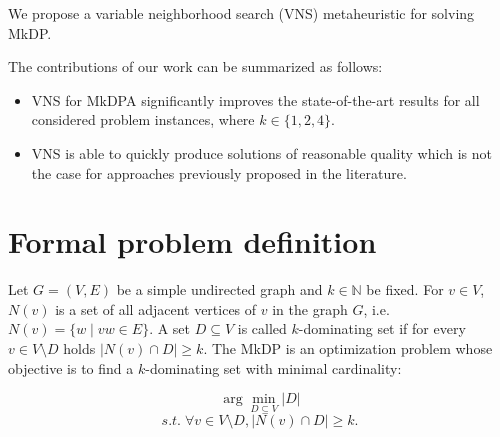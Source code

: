 \documentclass[dvipsnames,format=sigconf]{acmart} %
\begin{document}
We propose a variable neighborhood search (VNS) metaheuristic for solving MkDP. 
\begin{comment}
The main algorithm components of this algorithm are:
\begin{itemize}
	\item A carefully designed fitness function that evaluates solutions  including also unfeasible ones; it takes into consideration two scores ($i$) the size of dominating set and ($ii$) a measure of penalization that evaluates how far is the considered set from being a $k$--dominating. 
	\item A shaking procedure that systematically destructs feasible solutions and ensures escaping the algorithm from a local optima. It is based on swap operations. 
	\item An efficient swap--based  best-improvement local search mechanism   has been applied. It is equipped with an quick partial evaluation of the fitness function, executed in linear time.
\end{itemize}
\end{comment}
The contributions of our work can be summarized as follows:
\begin{itemize}	
	\item VNS for MkDPA significantly improves the state-of-the-art results for all considered problem instances, where $k \in \{1, 2, 4\}$.
	
	\item VNS is able to quickly produce solutions of reasonable quality which is not the case for approaches previously proposed in the literature.
\end{itemize}

\section{Formal problem definition }
    
Let $G=(V,E)$ be a simple undirected graph and $k \in \mathbb{N}$ be fixed. For $v\in V$, $N(v)$ is a set of all adjacent vertices of $v$ in the graph $G$, i.e. $N(v)=\{w \mid vw \in E\}$. A set $D \subseteq V$ is called $k$-dominating set if for every $v\in V \setminus D$ holds $|N(v) \cap D| \geq k$. The MkDP is an optimization problem whose objective is to find a $k$-dominating set with minimal cardinality:

\begin{equation}
\arg \min_{D \subseteq V } |D|
\end{equation}
\begin{equation}
	s.t. \; \forall v \in V \setminus D, |N(v) \cap D| \geq k.
\end{equation}
    
\end{document}
